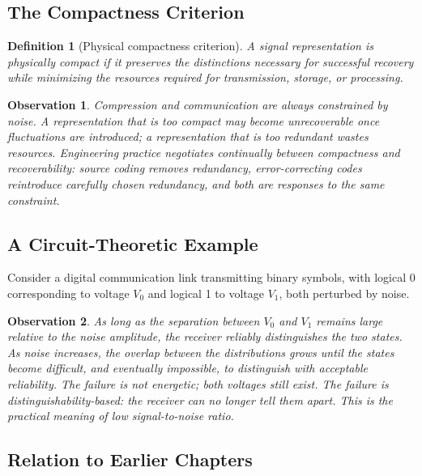 \documentclass[12pt]{article}
\newtheorem{definition}{Definition}
\newtheorem{observation}{Observation}
\begin{document}
\subsection{The Compactness Criterion}

\begin{definition}[Physical compactness criterion]
A signal representation is physically compact if it preserves the distinctions necessary for successful recovery while minimizing the resources required for transmission, storage, or processing.
\end{definition}

\begin{observation}
Compression and communication are always constrained by noise. A representation that is too compact may become unrecoverable once fluctuations are introduced; a representation that is too redundant wastes resources. Engineering practice negotiates continually between compactness and recoverability: source coding removes redundancy, error-correcting codes reintroduce carefully chosen redundancy, and both are responses to the same constraint.
\end{observation}

\subsection{A Circuit-Theoretic Example}

Consider a digital communication link transmitting binary symbols, with logical 0 corresponding to voltage $V_0$ and logical 1 to voltage $V_1$, both perturbed by noise.

\begin{observation}
As long as the separation between $V_0$ and $V_1$ remains large relative to the noise amplitude, the receiver reliably distinguishes the two states. As noise increases, the overlap between the distributions grows until the states become difficult, and eventually impossible, to distinguish with acceptable reliability. The failure is not energetic; both voltages still exist. The failure is distinguishability-based: the receiver can no longer tell them apart. This is the practical meaning of low signal-to-noise ratio.
\end{observation}

\subsection{Relation to Earlier Chapters}
\end{document}

